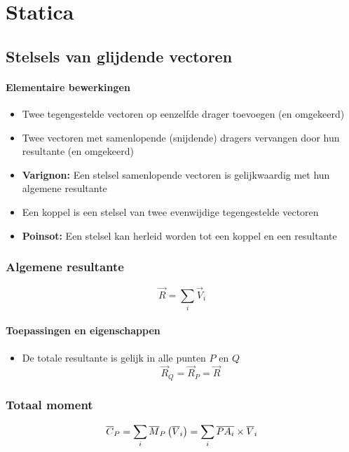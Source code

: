 \newpage
\section{Statica}
\label{sec:Statica}

\subsection{Stelsels van glijdende vectoren}
\label{sec:StelselsVanGlijdendeVectoren}
  \paragraph{Elementaire bewerkingen}
  \label{sec:ElemBewerkingGelijkwStelsels}
    \begin{itemize}
	    \item Twee tegengestelde vectoren op eenzelfde drager toevoegen (en omgekeerd)
	    \item Twee vectoren met samenlopende (snijdende) dragers vervangen door hun resultante (en omgekeerd)
	    \item \textbf{Varignon:} Een stelsel samenlopende vectoren is gelijkwaardig met hun algemene resultante
	    \item Een koppel is een stelsel van twee evenwijdige tegengestelde vectoren
	    \item \textbf{Poinsot:} Een stelsel kan herleid worden tot een koppel en een resultante
    \end{itemize}
  
  \subsubsection{Algemene resultante}
  \label{sec:AlgemeneResultante}
    \[
      \vec{R} = \sum_i \vec{V}_i
    \]
  \paragraph{Toepassingen en eigenschappen}
  \label{sec:eigToepAlgResultante}
    \begin{itemize}
      \item De totale resultante is gelijk in alle punten $P$ en $Q$
            \[
              \vec{R}_Q = \vec{R}_P = \vec{R}
            \]
    \end{itemize}
    
  \subsubsection{Totaal moment}
  \label{sec:TotaalMoment}
    \[
      \overline{C}_P = \sum_i \overline{M}_P \left(\overline{V}_i\right)
                = \sum_i \overline{PA_i} \times \overline{V}_i
    \]
